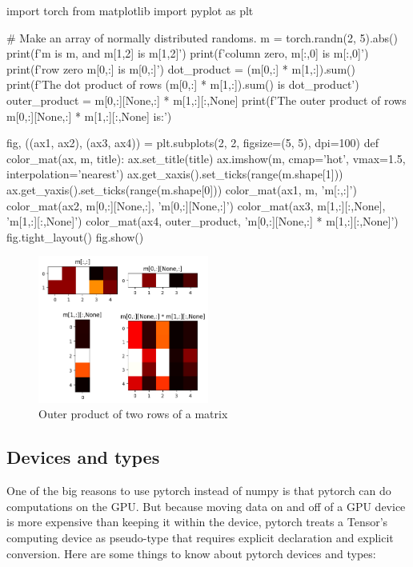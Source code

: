 \begin{exampleblock}
    \begin{codeblock}[language=python]
import torch
from matplotlib import pyplot as plt

# Make an array of normally distributed randoms.
m = torch.randn(2, 5).abs()
print(f'm is {m}, and m[1,2] is {m[1,2]}\n')
print(f'column zero, m[:,0] is {m[:,0]}')
print(f'row zero m[0,:] is {m[0,:]}\n')
dot_product = (m[0,:] * m[1,:]).sum()
print(f'The dot product of rows (m[0,:] * m[1,:]).sum() is {dot_product}\n')
outer_product = m[0,:][None,:] * m[1,:][:,None]
print(f'The outer product of rows m[0,:][None,:] * m[1,:][:,None] is:')

fig, ((ax1, ax2), (ax3, ax4)) = plt.subplots(2, 2, figsize=(5, 5), dpi=100)
def color_mat(ax, m, title):
    ax.set_title(title)
    ax.imshow(m, cmap='hot', vmax=1.5, interpolation='nearest')
    ax.get_xaxis().set_ticks(range(m.shape[1]))
    ax.get_yaxis().set_ticks(range(m.shape[0]))
color_mat(ax1, m, 'm[:,:]')
color_mat(ax2, m[0,:][None,:], 'm[0,:][None,:]')
color_mat(ax3, m[1,:][:,None], 'm[1,:][:,None]')
color_mat(ax4, outer_product, 'm[0,:][None,:] * m[1,:][:,None]')
fig.tight_layout()
fig.show()
    \end{codeblock}
\begin{figure}[H]
    \centering
    \includegraphics[width=0.5\textwidth]{assets/fig3.png}
    \caption{Outer product of two rows of a matrix}
\end{figure}
\end{exampleblock}

\subsection{Devices and types}

One of the big reasons to use pytorch instead of numpy is that pytorch can do computations on the GPU.  But because moving data on and off of a GPU device is more expensive than keeping it within the device, pytorch treats a Tensor's computing device as pseudo-type that requires explicit declaration and explicit conversion.  Here are some things to know about pytorch devices and types:

